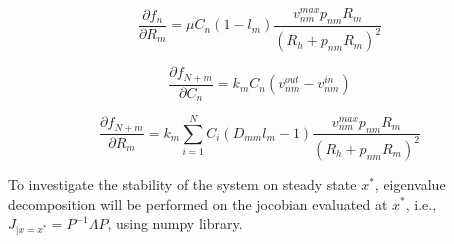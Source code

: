 \documentclass{article}
\begin{document}
\begin{equation}
    \frac{\partial{f_n}}{\partial{R_m}} = \mu C_n (1-l_m) \frac{v^{max}_{nm} p_{nm} R_m}{(R_h + p_{nm}R_m)^2}
\end{equation}

\begin{equation}
    \frac{\partial{f_{N+m}}}{\partial{C_n}} = k_m C_n (v^{out}_{nm} - v^{in}_{nm})
\end{equation}

\begin{equation}
    \frac{\partial{f_{N+m}}}{\partial{R_m}} = k_m \displaystyle \sum^N_{i=1} C_i (D_{mm}l_m - 1) \frac{v^{max}_{nm} p_{nm} R_m}{(R_h + p_{nm}R_m)^2}
\end{equation}

To investigate the stability of the system on steady state $x^*$, eigenvalue decomposition will be performed on the jocobian evaluated at $x^*$, i.e., $J_{|x=x^*} = P^{-1} \Lambda P $, using numpy library.
\end{document}
